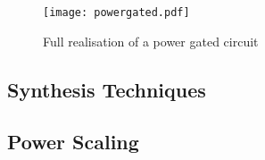 \begin{figure}
\texttt{[image: powergated.pdf]}
\caption{Full realisation of a power gated circuit}
\label{fig:powergated}
\end{figure}


\subsection{Synthesis Techniques}




\subsection{Power Scaling}

